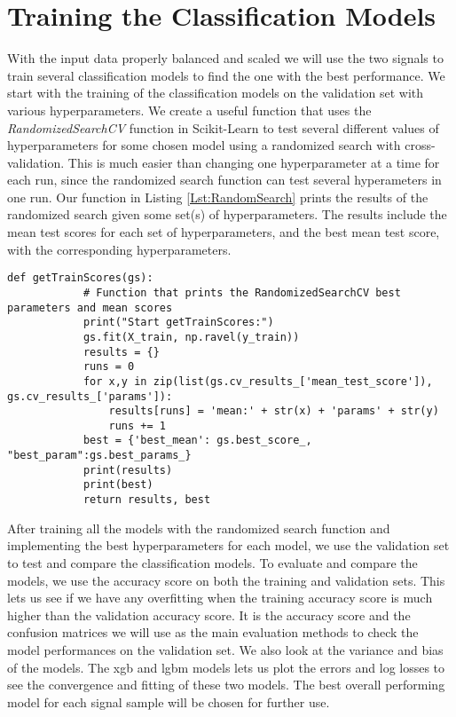 \documentclass[a4paper, american, 12pt]{report}
\begin{document}
	
	\section{Training the Classification Models} 
	\label{sect:Method-Tuning}
	With the input data properly balanced and scaled we will use the two signals to train several classification models to find the one with the best performance. We start with the training of the classification models on the validation set with various hyperparameters. We create a useful function that uses the \textit{RandomizedSearchCV} function in Scikit-Learn to test several different values of hyperparameters for some chosen model using a randomized search with cross-validation. This is much easier than changing one hyperparameter at a time for each run, since the randomized search function can test several hyperameters in one run. Our function in Listing \ref{Lst:RandomSearch} prints the results of the randomized search given some set(s) of hyperparameters. The results include the mean test scores for each set of hyperparameters, and the best mean test score, with the corresponding hyperparameters.
	\begin{lstlisting}[caption=Function for training models using a randomized search function., label=Lst:RandomSearch]
		def getTrainScores(gs):
			# Function that prints the RandomizedSearchCV best parameters and mean scores
			print("Start getTrainScores:")
			gs.fit(X_train, np.ravel(y_train))
			results = {}
			runs = 0
			for x,y in zip(list(gs.cv_results_['mean_test_score']), gs.cv_results_['params']):
				results[runs] = 'mean:' + str(x) + 'params' + str(y)
				runs += 1
			best = {'best_mean': gs.best_score_, "best_param":gs.best_params_}
			print(results)
			print(best)
			return results, best
	\end{lstlisting}
	
	After training all the models with the randomized search function and implementing the best hyperparameters for each model, we use the validation set to test and compare the classification models. To evaluate and compare the models, we use the accuracy score on both the training and validation sets. This lets us see if we have any overfitting when the training accuracy score is much higher than the validation accuracy score. It is the accuracy score and the confusion matrices we will use as the main evaluation methods to check the model performances on the validation set. We also look at the variance and bias of the models. The \acrshort{xgb} and \acrshort{lgbm} models lets us plot the errors and log losses to see the convergence and fitting of these two models. The best overall performing model for each signal sample will be chosen for further use.
	
\end{document}
